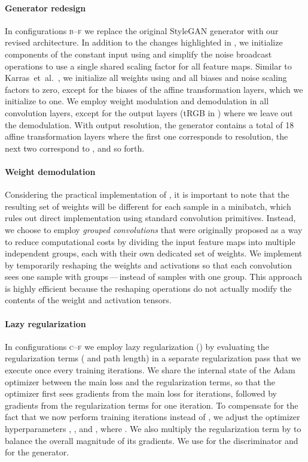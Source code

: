 \documentclass[10pt,twocolumn,letterpaper]{article}
\newcommand{\arch}[1]{\textsc{#1}}
\newcommand{\FINAL}[2][]{#2}
\begin{document}
\paragraph{Generator redesign}
In configurations \arch{b}--\arch{f} we replace the original StyleGAN generator with our revised architecture.
In addition to the changes highlighted in , we initialize components of the constant input  using  and simplify the noise broadcast operations to use a single shared scaling factor for all feature maps.
\FINAL{Similar to Karras~et~al.~\cite{Karras2018}, we initialize all weights using  and all biases and noise scaling factors to zero, except for the biases of the affine transformation layers, which we initialize to one.}
We employ weight modulation and demodulation in all convolution layers, except for the output layers (tRGB in ) where we leave out the demodulation.
With  output resolution, the generator contains a total of 18 affine transformation layers where the first one corresponds to  resolution, the next two correspond to , and so forth.

\paragraph{Weight demodulation}
Considering the practical implementation of , it is important to note that the resulting set of weights will be different for each sample in a minibatch, which rules out direct implementation using standard convolution primitives.
Instead, we choose to employ \emph{grouped convolutions} \cite{krizhevsky2012} that were originally proposed as a way to reduce computational costs by dividing the input feature maps into multiple independent groups, each with their own dedicated set of weights.
We implement  by temporarily reshaping the weights and activations so that each convolution sees one sample with  groups\,---\,instead of  samples with one group.
This approach is highly efficient because the reshaping operations do not actually modify the contents of the weight and activation tensors.

\paragraph{Lazy regularization}
In configurations \arch{c}--\arch{f} we employ lazy regularization () by evaluating the regularization terms ( and path length) in a separate regularization pass that we execute once every  training iterations.
We share the internal state of the Adam optimizer between the main loss and the regularization terms, so that the optimizer first sees gradients from the main loss for  iterations, followed by gradients from the regularization terms for one iteration.
To compensate for the fact that we now perform  training iterations instead of , we adjust the optimizer hyperparameters , , and , where .
We also multiply the regularization term by  to balance the overall magnitude of its gradients.
We use  for the discriminator and  for the generator.
\end{document}
